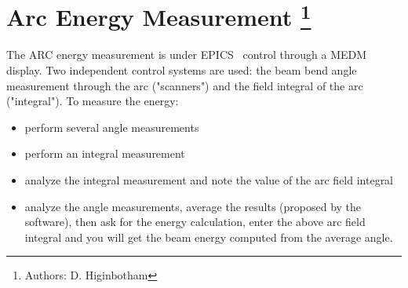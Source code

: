 \chapter[Arc Energy Measurement]{Arc Energy Measurement
\footnote{Authors: D. Higinbotham }
}

The ARC energy measurement is under EPICS~\cite{EPICSwww} control through 
a MEDM~\cite{MEDMwww} display. Two
independent control systems are used: the beam bend angle measurement through
the arc ("scanners") and the field integral of
the arc ("integral"). To measure the energy: 

\begin{itemize}
\item perform several angle measurements 
\item perform an integral measurement 
\item analyze the integral measurement and note the value of the arc field 
integral 
\item analyze the angle measurements, average the results (proposed by the 
software),
then ask for the energy calculation, enter the above arc field integral and
you will get the beam energy computed from the average angle. 
\end{itemize}

